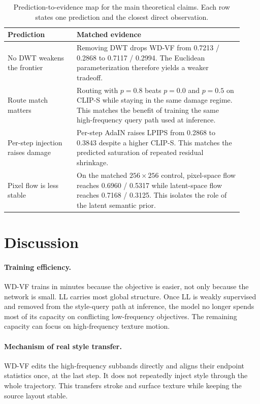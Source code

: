 \documentclass[letterpaper]{article}
\begin{document}
\begin{table}[t]
\centering
\caption{Prediction-to-evidence map for the main theoretical claims. Each row states one prediction and the closest direct observation.}
\label{tab:theorylink}
\scriptsize
\renewcommand{\arraystretch}{0.80}
\setlength{\tabcolsep}{3pt}
\begin{tabular}{@{}p{0.27\linewidth}p{0.65\linewidth}@{}}
\toprule
Prediction & Matched evidence \\
\midrule
No DWT weakens the frontier & Removing DWT drops WD-VF from 0.7213 / 0.2868 to 0.7117 / 0.2994. The Euclidean parameterization therefore yields a weaker tradeoff. \\
Route match matters & Routing with $p=0.8$ beats $p=0.0$ and $p=0.5$ on CLIP-S while staying in the same damage regime. This matches the benefit of training the same high-frequency query path used at inference. \\
Per-step injection raises damage & Per-step AdaIN raises LPIPS from 0.2868 to 0.3843 despite a higher CLIP-S. This matches the predicted saturation of repeated residual shrinkage. \\
Pixel flow is less stable & On the matched $256\times256$ control, pixel-space flow reaches 0.6960 / 0.5317 while latent-space flow reaches 0.7168 / 0.3125. This isolates the role of the latent semantic prior. \\
\bottomrule
\end{tabular}
\end{table}

\section{Discussion}

\paragraph{Training efficiency.}
WD-VF trains in minutes because the objective is easier, not only because the network is small.
LL carries most global structure.
Once LL is weakly supervised and removed from the style-query path at inference, the model no longer spends most of its capacity on conflicting low-frequency objectives.
The remaining capacity can focus on high-frequency texture motion.

\paragraph{Mechanism of real style transfer.}
WD-VF edits the high-frequency subbands directly and aligns their endpoint statistics once, at the last step.
It does not repeatedly inject style through the whole trajectory.
This transfers stroke and surface texture while keeping the source layout stable.
\end{document}
